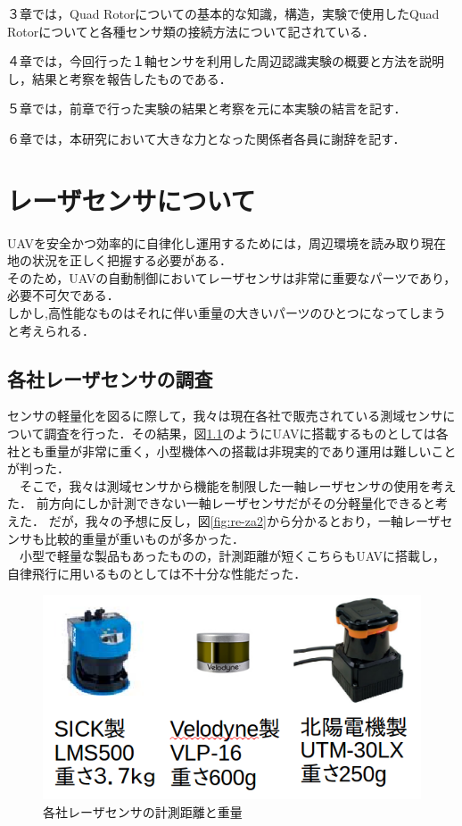 \documentclass[12pt,oneside]{sotsuken_paper}
\begin{document}
３章では，Quad Rotorについての基本的な知識，構造，実験で使用したQuad Rotorについてと各種センサ類の接続方法について記されている．


４章では，今回行った１軸センサを利用した周辺認識実験の概要と方法を説明し，結果と考察を報告したものである．


５章では，前章で行った実験の結果と考察を元に本実験の結言を記す．


６章では，本研究において大きな力となった関係者各員に謝辞を記す．
\chapter{レーザセンサについて}UAVを安全かつ効率的に自律化し運用するためには，周辺環境を読み取り現在地の状況を正しく把握する必要がある．\\
そのため，UAVの自動制御においてレーザセンサは非常に重要なパーツであり，必要不可欠である．\\
しかし,高性能なものはそれに伴い重量の大きいパーツのひとつになってしまうと考えられる．\\


\section{各社レーザセンサの調査}センサの軽量化を図るに際して，我々は現在各社で販売されている測域センサについて調査を行った．その結果，図\ref{fig:re-za}のようにUAVに搭載するものとしては各社とも重量が非常に重く，小型機体への搭載は非現実的であり運用は難しいことが判った．\\
　そこで，我々は測域センサから機能を制限した一軸レーザセンサの使用を考えた．
前方向にしか計測できない一軸レーザセンサだがその分軽量化できると考えた．
だが，我々の予想に反し，図\ref{fig:re-za2}から分かるとおり，一軸レーザセンサも比較的重量が重いものが多かった．\\
　小型で軽量な製品もあったものの，計測距離が短くこちらもUAVに搭載し，自律飛行に用いるものとしては不十分な性能だった．

\begin{figure}[H]
\begin{center}
\includegraphics[width=120mm]{img/re-za.png}
\end{center}
\caption{各社レーザセンサの計測距離と重量}
\label{fig:re-za}
\end{figure}
\end{document}
